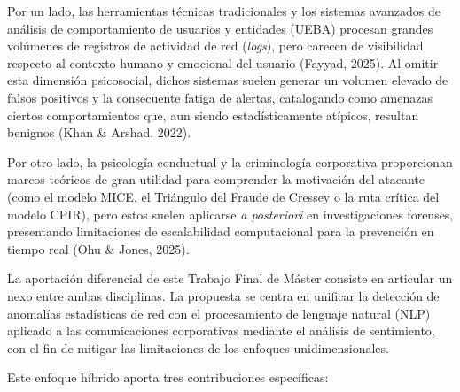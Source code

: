 \documentclass[IB]{TFUOC}%
\begin{document}
\medskip
\noindent Por un lado, las herramientas técnicas tradicionales y los sistemas avanzados de análisis de comportamiento de usuarios y entidades (UEBA) procesan grandes volúmenes de registros de actividad de red (\textit{logs}), pero carecen de visibilidad respecto al contexto humano y emocional del usuario (Fayyad, 2025). Al omitir esta dimensión psicosocial, dichos sistemas suelen generar un volumen elevado de falsos positivos y la consecuente fatiga de alertas, catalogando como amenazas ciertos comportamientos que, aun siendo estadísticamente atípicos, resultan benignos (Khan \& Arshad, 2022).

\medskip
\noindent Por otro lado, la psicología conductual y la criminología corporativa proporcionan marcos teóricos de gran utilidad para comprender la motivación del atacante (como el modelo MICE, el Triángulo del Fraude de Cressey o la ruta crítica del modelo CPIR), pero estos suelen aplicarse \textit{a posteriori} en investigaciones forenses, presentando limitaciones de escalabilidad computacional para la prevención en tiempo real (Ohu \& Jones, 2025).

\medskip
\noindent La aportación diferencial de este Trabajo Final de Máster consiste en articular un nexo entre ambas disciplinas. La propuesta se centra en unificar la detección de anomalías estadísticas de red con el procesamiento de lenguaje natural (NLP) aplicado a las comunicaciones corporativas mediante el análisis de sentimiento, con el fin de mitigar las limitaciones de los enfoques unidimensionales.

\medskip
\noindent Este enfoque híbrido aporta tres contribuciones específicas:
\end{document}
